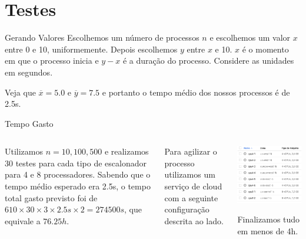 \documentclass{beamer}
\begin{document}
\section{Testes}

\begin{frame}{Gerando Valores}
	\justifying
	Escolhemos um número de processos $n$ e escolhemos um valor $x$ entre  0 e 10, uniformemente. Depois escolhemos $y$ entre $x$ e 10. $x$ é o momento em que o processo inicia e $y-x$ é a duração do processo. Considere as unidades em segundos.
	
	Veja que $\overline{x} = 5.0$ e $\overline{y} = 7.5$ e portanto o tempo médio dos nossos processos é de 2.5s.
\end{frame}


\begin{frame}{Tempo Gasto}
	\begin{columns}[T,onlytextwidth]
		\justifying
		Utilizamos $n = 10, 100, 500$ e realizamos 30 testes para cada tipo de escalonador para 4 e 8 processadores. Sabendo que o tempo médio esperado era 2.5s, o tempo total gasto previsto foi de $610 \times 30 \times 3 \times 2.5s \times 2 = 274500s$, que equivale a $76.25h$.
		
		Para agilizar o processo utilizamos um serviço de cloud com a seguinte configuração descrita ao lado.
		
		
		\begin{center}
			\includegraphics[scale=0.4]{cloud}
			
			{\tiny *Finalizamos tudo em menos de 4h.}
		\end{center}
		
	\end{columns}
\end{frame}
\end{document}
